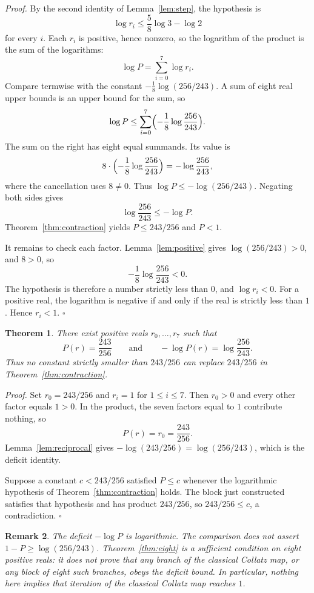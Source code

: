 \documentclass[11pt,letterpaper]{article}
\newtheorem{theorem}{Theorem}
\newtheorem{remark}[theorem]{Remark}
\newenvironment{proof}{\noindent\textit{Proof.}}{\hfill\(\square\)}
\begin{document}
\begin{proof}
By the second identity of Lemma~\ref{lem:step}, the hypothesis is
\[
\log r_i\le \frac58\log 3-\log 2
\]
for every \(i\). Each \(r_i\) is positive, hence nonzero, so the logarithm of the product is the sum of the logarithms:
\[
\log P=\sum_{i=0}^{7}\log r_i.
\]
Compare termwise with the constant \(-\frac18\log(256/243)\). A sum of eight real upper bounds is an upper bound for the sum, so
\[
\log P\le \sum_{i=0}^{7}\Bigl(-\frac18\log\frac{256}{243}\Bigr).
\]
The sum on the right has eight equal summands. Its value is
\[
8\cdot\Bigl(-\frac18\log\frac{256}{243}\Bigr)=-\log\frac{256}{243},
\]
where the cancellation uses \(8\neq 0\). Thus \(\log P\le -\log(256/243)\). Negating both sides gives
\[
\log\frac{256}{243}\le -\log P.
\]
Theorem~\ref{thm:contraction} yields \(P\le 243/256\) and \(P<1\).

It remains to check each factor. Lemma~\ref{lem:positive} gives \(\log(256/243)>0\), and \(8>0\), so
\[
-\frac18\log\frac{256}{243}<0.
\]
The hypothesis is therefore a number strictly less than \(0\), and \(\log r_i<0\). For a positive real, the logarithm is negative if and only if the real is strictly less than \(1\). Hence \(r_i<1\).
\end{proof}

\begin{theorem}
\label{thm:sharp}
There exist positive reals \(r_0,\ldots,r_7\) such that
\[
P(r)=\frac{243}{256}
\qquad\text{and}\qquad
-\log P(r)=\log\frac{256}{243}.
\]
Thus no constant strictly smaller than \(243/256\) can replace \(243/256\) in Theorem~\ref{thm:contraction}.
\end{theorem}

\begin{proof}
Set \(r_0=243/256\) and \(r_i=1\) for \(1\le i\le 7\). Then \(r_0>0\) and every other factor equals \(1>0\). In the product, the seven factors equal to \(1\) contribute nothing, so
\[
P(r)=r_0=\frac{243}{256}.
\]
Lemma~\ref{lem:reciprocal} gives \(-\log(243/256)=\log(256/243)\), which is the deficit identity.

Suppose a constant \(c<243/256\) satisfied \(P\le c\) whenever the logarithmic hypothesis of Theorem~\ref{thm:contraction} holds. The block just constructed satisfies that hypothesis and has product \(243/256\), so \(243/256\le c\), a contradiction.
\end{proof}

\begin{remark}
\label{rem:scope}
The deficit \(-\log P\) is logarithmic. The comparison does not assert \(1-P\ge\log(256/243)\). Theorem~\ref{thm:eight} is a sufficient condition on eight positive reals: it does not prove that any branch of the classical Collatz map, or any block of eight such branches, obeys the deficit bound. In particular, nothing here implies that iteration of the classical Collatz map reaches \(1\).
\end{remark}
\end{document}

